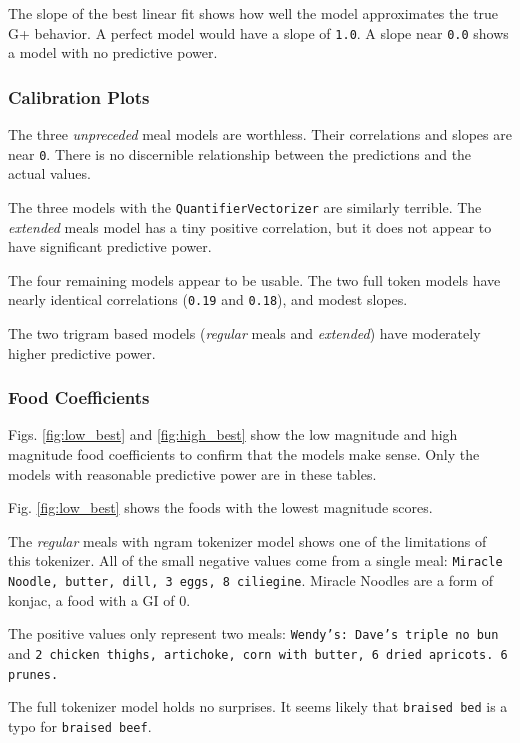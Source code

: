 \documentclass[conference]{IEEEtran}
\begin{document}
The slope of the best linear fit shows how well the model approximates the true G+ behavior. A perfect model would have a slope of \texttt{1.0}. A slope near \texttt{0.0} shows a model with no predictive power.

\subsubsection{Calibration Plots}

The three \emph{unpreceded} meal models are worthless. Their correlations and slopes are near \texttt{0}. There is no discernible relationship between the predictions and the actual values.

The three models with the \texttt{QuantifierVectorizer} are similarly terrible. The \emph{extended} meals model has a tiny positive correlation, but it does not appear to have significant predictive power.

The four remaining models appear to be usable. The two full token models have nearly identical correlations (\texttt{0.19} and \texttt{0.18}), and modest slopes.

The two trigram based models (\emph{regular} meals and \emph{extended}) have moderately higher predictive power.

\subsubsection{Food Coefficients}

Figs. \ref{fig:low_best} and \ref{fig:high_best} show the low magnitude and high magnitude food coefficients to confirm that the models make sense. Only the models with reasonable predictive power are in these tables.

Fig. \ref{fig:low_best} shows the foods with the lowest magnitude scores.

The \emph{regular} meals with ngram tokenizer model shows one of the limitations of this tokenizer. All of the small negative values come from a single meal: \texttt{Miracle Noodle, butter, dill, 3 eggs, 8 ciliegine}. Miracle Noodles are a form of konjac, a food with a GI of 0.

The positive values only represent two meals: \texttt{Wendy's: Dave's triple no bun} and \texttt{2 chicken thighs, artichoke, corn with butter, 6 dried apricots. 6 prunes.}

The full tokenizer model holds no surprises. It seems likely that \texttt{braised bed} is a typo for \texttt{braised beef}.
\end{document}
